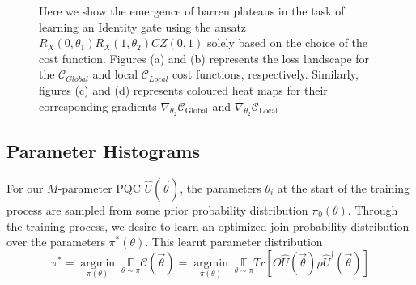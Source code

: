 \documentclass[%
 reprint,
 amsmath,
 amssymb,
 showkeys,
 pra,
 floatfix,
]{revtex4-2}
\begin{document}
\begin{figure}[t]
\begin{subfigure}[b]{0.48\textwidth}
\begin{minipage}{0.9\textwidth}
    \end{minipage}
    \end{subfigure}
    \caption[Presence of barren plateaus in parameterized quantum circuits]{Here we show the emergence of barren plateaus in the task of learning an Identity gate using the ansatz $R_X(0,\theta_1)R_X(1, \theta_2)CZ(0, 1)$ solely based on the choice of the cost function. Figures (a) and (b) represents the loss landscape for the $\mathcal{C}_{Global}$ and local $\mathcal{C}_{Local}$ cost functions, respectively. Similarly, figures (c) and (d) represents coloured heat maps for their  corresponding gradients $\nabla_{\theta_2}\mathcal{C}_{\text{Global}}$ and $\nabla_{\theta_2}\mathcal{C}_{\text{Local}}$} 
    \label{fig:barren-plateau}
\end{figure}



\subsection{Parameter Histograms}

For our $M$-parameter PQC $\hat{U}(\vec{\theta})$, the parameters $\theta_i$ at the start of the training process are sampled from some prior probability distribution $\pi_0(\theta)$. Through the training process, we desire to learn an optimized join probability distribution over the parameters $\pi^*(\theta)$. This learnt parameter distribution
\begin{equation}
    \pi^* = \underset{\pi(\theta)}{\operatorname{argmin}} \; \underset{\theta \sim \pi}{\mathbb{E}} \mathcal{C}(\vec{\theta}) = \underset{\pi(\theta)}{\operatorname{argmin}} \; \underset{\theta \sim \pi}{\mathbb{E}} Tr[O \hat{U}(\vec{\theta}) \rho \hat{U}^\dagger(\vec{\theta})]
\end{equation}
\end{document}
